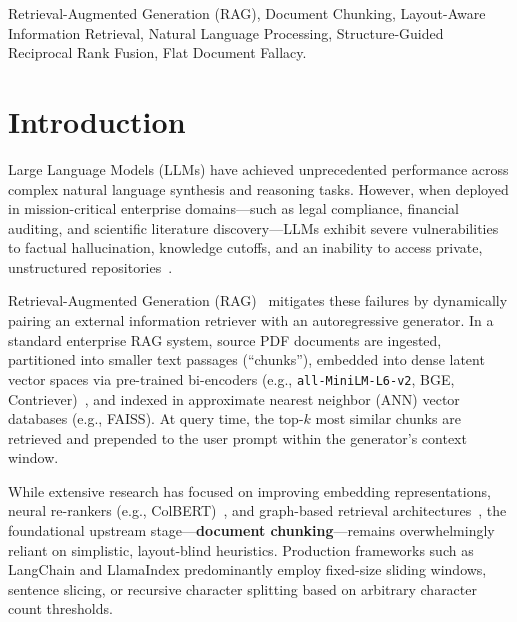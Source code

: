 \documentclass[conference]{IEEEtran}
\begin{document}
\begin{IEEEkeywords}
Retrieval-Augmented Generation (RAG), Document Chunking, Layout-Aware Information Retrieval, Natural Language Processing, Structure-Guided Reciprocal Rank Fusion, Flat Document Fallacy.
\end{IEEEkeywords}

\section{Introduction}

Large Language Models (LLMs) have achieved unprecedented performance across complex natural language synthesis and reasoning tasks. However, when deployed in mission-critical enterprise domains---such as legal compliance, financial auditing, and scientific literature discovery---LLMs exhibit severe vulnerabilities to factual hallucination, knowledge cutoffs, and an inability to access private, unstructured repositories~\cite{lewis2020rag,borgeaud2022retro}.

Retrieval-Augmented Generation (RAG)~\cite{lewis2020rag} mitigates these failures by dynamically pairing an external information retriever with an autoregressive generator. In a standard enterprise RAG system, source PDF documents are ingested, partitioned into smaller text passages (``chunks''), embedded into dense latent vector spaces via pre-trained bi-encoders (e.g., \texttt{all-MiniLM-L6-v2}, BGE, Contriever)~\cite{reimers2019sbert}, and indexed in approximate nearest neighbor (ANN) vector databases (e.g., FAISS). At query time, the top-$k$ most similar chunks are retrieved and prepended to the user prompt within the generator's context window.

While extensive research has focused on improving embedding representations, neural re-rankers (e.g., ColBERT)~\cite{khattab2020colbert}, and graph-based retrieval architectures~\cite{edge2024graphrag}, the foundational upstream stage---\textbf{document chunking}---remains overwhelmingly reliant on simplistic, layout-blind heuristics. Production frameworks such as LangChain and LlamaIndex predominantly employ fixed-size sliding windows, sentence slicing, or recursive character splitting based on arbitrary character count thresholds.
\end{document}
